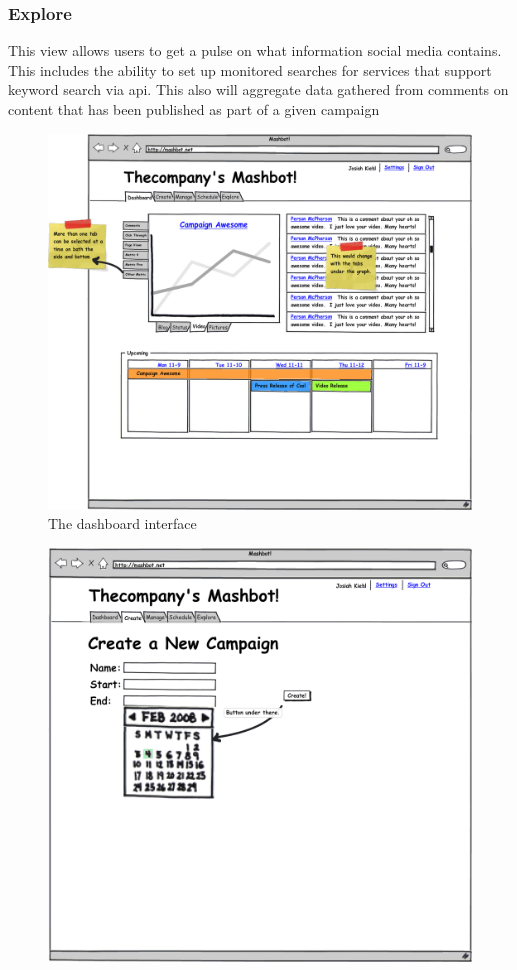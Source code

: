 \documentclass{article}
\begin{document}
\begin{description}
\subsubsection{Explore}
This view allows users to get a pulse on what information social media
contains.  This includes the ability to set up monitored searches for
services that support keyword search via api.  This also will
aggregate data gathered from comments on content that has been
published as part of a given campaign
\clearpage
\begin{figure}
\centering
\includegraphics[scale=0.35]{../mockups/dashboard.png}
\caption{The dashboard interface}
\label{dashboard}
\end{figure}
\clearpage
\begin{figure}
\centering
\includegraphics[scale=0.35]{../mockups/create.png}

\end{figure}
\end{description}
\end{document}
